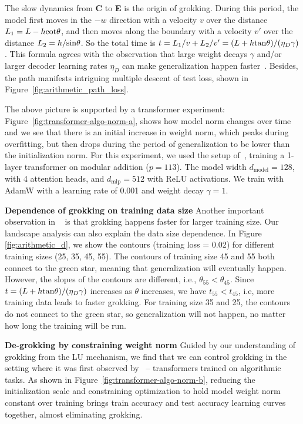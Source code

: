 \documentclass{article} %
\begin{document}
The slow dynamics from {\bf C} to {\bf E} is the origin of grokking. During this period, the model first moves in the $-w$ direction with a velocity $v$ over the distance $L_1=L-h{\rm cot}\theta$, and then moves along the boundary with a velocity $v'$ over the distance $L_2=h/{\rm sin}\theta$. So the total time is $t=L_1/v+L_2/v'=(L+h{\rm tan}\theta)/(\eta_D\gamma)$. This formula agrees with the observation that large weight decays $\gamma$ and/or larger decoder learning rates $\eta_D$ can make generalization happen faster~\citep{power2022grokking, liu2022towards}. Besides, the path manifests intriguing multiple descent of test loss, shown in Figure~\ref{fig:arithmetic_path_loss}.

The above picture is supported by a transformer experiment: Figure~\ref{fig:transformer-algo-norm-a}, shows how model norm changes over time and we see that there is an initial increase in weight norm, which peaks during overfitting, but then drops during the period of generalization to be lower than the initialization norm. For this experiment, we used the setup of~\citep{neel2022}, training a 1-layer transformer on modular addition ($p=113$). The model width $d_\text{model} = 128$, with 4 attention heads, and $d_\text{mlp} = 512$ with ReLU activations. We train with AdamW with a learning rate of 0.001 and weight decay $\gamma = 1$. 


{\bf Dependence of grokking on training data size} Another important observation in ~\citep{power2022grokking} is that grokking happens faster for larger training size. Our landscape analysis can also explain the data size dependence. In Figure \ref{fig:arithmetic_d}, we show the contours (training loss = 0.02) for different training sizes (25, 35, 45, 55). The contours of training size 45 and 55 both connect to the green star, meaning that  generalization will eventually happen. However, the slopes of the contours are different, i.e., $\theta_{55}<\theta_{45}$. Since $t=(L+h{\rm tan}\theta)/(\eta_D\gamma)$ increases as $\theta$ increases, we have $t_{55}<t_{45}$, i.e, more training data leads to faster grokking. For training size 35 and 25, the contours do not connect to the green star, so generalization will not happen, no matter how long the training will be run.

{\bf De-grokking by constraining weight norm} Guided by our understanding of grokking from the LU mechanism, we find that we can control grokking in the setting where it was first observed by~\cite{power2022grokking} -- transformers trained on algorithmic tasks. As shown in Figure~\ref{fig:transformer-algo-norm-b}, reducing the initialization scale and constraining optimization to hold model weight norm constant over training brings train accuracy and test accuracy learning curves together, almost eliminating grokking.
\end{document}
